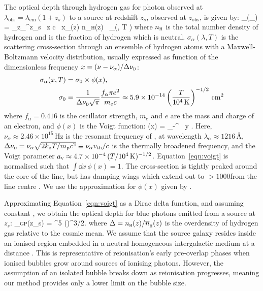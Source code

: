 \documentclass[fleqn,usenatbib]{mnras}
\begin{document}
The \lya optical depth through hydrogen gas for photon observed at $\lambda_\mathrm{obs} = \lambda_\mathrm{em}(1+z_s)$ to a source at redshift $z_s$, observed at $z_\mathrm{obs}$, is given by:
%
\BE \label{eqn:optdepth}
\tau_\alpha(\lambda_) = \int_{z_}^{z_s} \, \dd z \; c  \, x_\HI(z) n_\textsc{h}(z)  \, \sigma_\alpha\left(, T \right)
\EE
%
where $n_\textsc{h}$ is the total number density of hydrogen and \xHI is the fraction of hydrogen which is neutral. $\sigma_\alpha(\lambda, T)$ is the \lya scattering cross-section through an ensemble of hydrogen atoms with a Maxwell-Boltzmann velocity distribution, usually expressed as function of the dimensionless frequency $x = (\nu - \nu_\alpha)/\Delta \nu_\textsc{d}$:
%
\begin{align} \label{eqn:crosssection}
\sigma_\alpha(x, T) &= \sigma_0 \times \phi(x),\\
\sigma_0 &= \frac{1}{\Delta \nu_\textsc{d} \sqrt{\pi}} \frac{f_\alpha \pi e^2}{m_e c} \approx 5.9 \times 10^{-14} \left(\frac{T}{10^4\,\mathrm{K}}\right)^{-1/2} \cm^2 \nonumber
\end{align}
%
where $f_\alpha = 0.416$ is the \lya oscillator strength, $m_e$ and $e$ are the mass and charge of an electron, and $\phi(x)$ is the Voigt function:
%
\BE \label{eqn:voigt}
\phi(x) =  \int_{-\infty}^{\infty} \, \dd y \; .
\EE
%
Here, $\nu_\alpha \approx 2.46\times10^{15}$\,Hz is the resonant frequency of \lya, at wavelength $\lambda_\alpha \approx 1216$\,\AA, $\Delta \nu_\textsc{d} = \nu_\alpha \sqrt{2k_\textsc{b}T/m_\mathrm{p}c^2} \equiv \nu_\alpha v_\textrm{th}/c$ is the thermally broadened frequency, and the Voigt parameter $a_\textsc{v} \approx 4.7\times10^{-4}\,(T/10^4\,\mathrm{K})^{-1/2}$. Equation~\eqref{eqn:voigt} is normalised such that $\int \dd x \, \phi(x) =1$. The cross-section is tightly peaked around the core of the line, but has damping wings which extend out to $>1000$\kms from the line centre \citep[e.g.,][]{Dijkstra2014}. We use the approximation for $\phi(x)$ given by \citet{Tasitsiomi2006}.

Approximating Equation~\eqref{eqn:voigt} as a Dirac delta function, and assuming constant \xHI, we obtain the \citet{Gunn1965} optical depth for blue photons emitted from a source at $z_s$:
%
\BE \label{eqn:tau_GP}
\tau_\textsc{gp}(z_s) =   ^5 \xHI \Delta \left(\right)^{3/2}.
\EE
%
where $\Delta=n_\textsc{h}(z)/\nh(z)$ is the overdensity of hydrogen gas relative to the cosmic mean. We assume that the source galaxy resides inside an ionised region embedded in a neutral homogeneous intergalactic medium at a distance \Rion. This is representative of reionisation's early pre-overlap phases when ionised bubbles grow around sources of ionising photons. However, the assumption of an isolated bubble breaks down as reionisation progresses, meaning our method provides only a lower limit on the bubble size.
\end{document}
